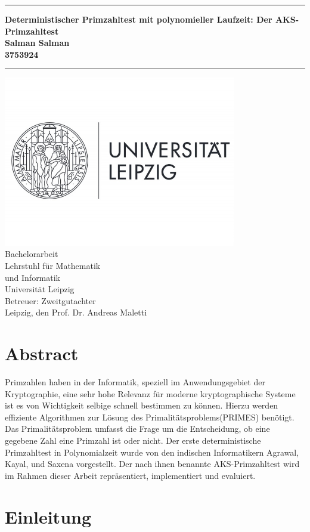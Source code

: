 \documentclass[12pt,oneside]{article}
\theoremstyle{remark}
\theoremstyle{definition}
\newcommand{\JMUTitle}[9]{

  \thispagestyle{empty}
  \vspace*{\stretch{1}}
  {\parindent0cm
  \rule{\linewidth}{.7ex}}
  \begin{flushright}
    \vspace*{\stretch{1}}
    \sffamily\bfseries\Huge
    #1\\
    \vspace*{\stretch{1}}
    \sffamily\bfseries\large
    #2\\
    \vspace*{\stretch{1}}
    \sffamily\bfseries\small
    #3
  \end{flushright}
  \rule{\linewidth}{.7ex}

  \vspace*{\stretch{1}}
  \begin{center}
    \includegraphics[width=4in]{logo} \\
    \vspace*{\stretch{1}}
    \Large  Bachelorarbeit   \\

    \vspace*{\stretch{2}}
   \large Lehrstuhl für Mathematik \\
    \large und Informatik \\
    \large Universität Leipzig\\
    \vspace*{\stretch{1}}
    \large Betreuer:  #8 \\[1mm]
    
    \vspace*{\stretch{1}}
    \large Leipzig, den #7
  \end{center}
}
\begin{document}
  \JMUTitle
      {Deterministischer Primzahltest mit polynomieller Laufzeit: Der AKS-Primzahltest}  
      {Salman Salman}                        
      {3753924}
      
      {Fakultät für Informatik und Mathematik}  %
      {Leipzig 2020}                          %
      {\today}                              %
      {Prof. Dr. Andreas Maletti}               %
      {Zweitgutachter}                          %
      
  \clearpage

\lhead{}
    \setcounter{page}{1}

\tableofcontents
\clearpage

\listoffigures

\listoftables
\clearpage

\setlength{\parskip}{0.5em} 


\section*{Abstract}
Primzahlen haben in der Informatik, speziell im Anwendungsgebiet der Kryptographie, eine sehr hohe Relevanz für moderne kryptographische Systeme ist es von Wichtigkeit selbige schnell bestimmen zu können. Hierzu werden effiziente Algorithmen zur Lösung des Primalitätsproblems(PRIMES) benötigt. Das Primalitätsproblem umfasst die Frage um die Entscheidung, ob eine gegebene Zahl eine Primzahl ist oder nicht. Der erste deterministische Primzahltest in Polynomialzeit wurde von den indischen Informatikern Agrawal, Kayal, und Saxena vorgestellt. Der nach ihnen benannte AKS-Primzahltest wird im Rahmen dieser Arbeit repräsentiert, implementiert und evaluiert.  


\clearpage
{}  
    \setcounter{page}{1}
\lhead{\nouppercase{\leftmark}}


 

\section{Einleitung} \label{einleitung}
\end{document}
